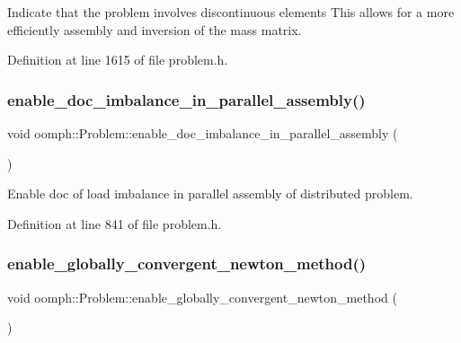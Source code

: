 Indicate that the problem involves discontinuous elements This allows for a more efficiently assembly and inversion of the mass matrix. 



Definition at line 1615 of file problem.\+h.

\mbox{\label{classoomph_1_1Problem_a577bca9cc5ee9504480b372f82e924dd}} 
\subsubsection{\texorpdfstring{enable\+\_\+doc\+\_\+imbalance\+\_\+in\+\_\+parallel\+\_\+assembly()}{enable\_doc\_imbalance\_in\_parallel\_assembly()}}
{\footnotesize\ttfamily void oomph\+::\+Problem\+::enable\+\_\+doc\+\_\+imbalance\+\_\+in\+\_\+parallel\+\_\+assembly (\begin{DoxyParamCaption}{ }\end{DoxyParamCaption})\hspace{0.3cm}{\ttfamily [inline]}}



Enable doc of load imbalance in parallel assembly of distributed problem. 



Definition at line 841 of file problem.\+h.

\mbox{\label{classoomph_1_1Problem_ac7c7711978f7c02becb4005414f945be}} 
\subsubsection{\texorpdfstring{enable\+\_\+globally\+\_\+convergent\+\_\+newton\+\_\+method()}{enable\_globally\_convergent\_newton\_method()}}
{\footnotesize\ttfamily void oomph\+::\+Problem\+::enable\+\_\+globally\+\_\+convergent\+\_\+newton\+\_\+method (\begin{DoxyParamCaption}{ }\end{DoxyParamCaption})\hspace{0.3cm}{\ttfamily [inline]}}



